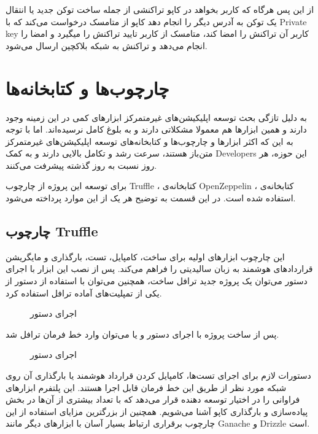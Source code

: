 از این پس هرگاه که کاربر بخواهد در کاپو تراکنشی از جمله ساخت توکن جدید یا انتقال یک توکن به آدرس دیگر را انجام دهد کاپو از متامسک درخواست می‌کند که با
\gls{Private key}
کاربر آن تراکنش را امضا کند، متامسک از کاربر تایید تراکنش را میگیرد و امضا را انجام می‌دهد و تراکنش به شبکه بلاکچین ارسال می‌شود.


\section{چارچوب‌ها و کتابخانه‌ها}
به دلیل تازگی بحث توسعه اپلیکیشن‌های غیرمتمرکز ابزارهای کمی در این زمینه وجود دارند و همین ابزارها هم معمولا مشکلاتی دارند و به بلوغ کامل نرسیده‌اند. اما با توجه به این که اکثر ابزارها و چارچوب‌ها و کتابخانه‌های توسعه اپلیکیشن‌های غیرمتمرکز متن‌باز هستند، سرعت رشد و تکامل بالایی دارند و به کمک
\glspl{Developer}
این حوزه، هر روز نسبت به روز گذشته پیشرفت می‌کنند.

برای توسعه این پروژه از
چارچوب Truffle
،
کتابخانه‌ی OpenZeppelin
،
کتابخانه‌ی
استفاده شده است. در این قسمت به توضیح هر یک از این موارد پرداخته می‌شود.

\subsection{چارچوب Truffle}
این چارچوب ابزارهای اولیه برای ساخت، کامپایل، تست، بارگذاری و مایگریشن قراردادهای هوشمند به زبان سالیدیتی را فراهم می‌کند. پس از نصب این ابزار با اجرای دستور
می‌توان یک پروژه جدید ترافل ساخت، همچنین می‌توان با استفاده از دستور
از یکی از تمپلیت‌های آماده ترافل استفاده کرد.

\begin{figure}[ht]
\centerline{}
\caption{اجرای دستور }
\label{fig:truffle-init}
\end{figure}

پس از ساخت پروژه با اجرای دستور
و یا
 می‌توان وارد خط فرمان ترافل شد.

\begin{figure}[ht]
\centerline{}
\caption{اجرای دستور }
\label{fig:truffle-develop}
\end{figure}

دستورات لازم برای اجرای تست‌ها، کامپایل کردن قرارداد هوشمند یا بارگذاری آن روی شبکه مورد نظر از طریق این خط فرمان قابل اجرا هستند. این پلتفرم ابزارهای فراوانی را در اختیار توسعه دهنده قرار می‌دهد که با تعداد بیشتری از آن‌ها در بخش پیاده‌سازی و بارگذاری کاپو آشنا می‌شویم. همچنین از بزرگترین مزایای استفاده از این چارچوب برقراری ارتباط بسیار آسان با ابزارهای دیگر مانند Ganache و Drizzle است.

